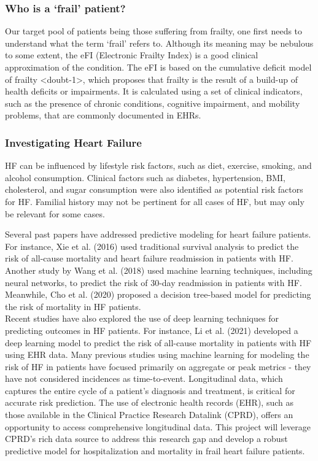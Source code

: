 \documentclass[%
 reprint,
 amsmath,amssymb,
 aps,
 nofootinbib
]{revtex4-2}
\theoremstyle{definition}
\begin{document}
\subsubsection{\label{frail}Who is a `frail' patient?}
Our target pool of patients being those suffering from frailty, one first needs to understand what the term `frail' refers to. Although its meaning may be nebulous to some extent, the eFI (Electronic Frailty Index) is a good clinical approximation of the condition. The eFI is based on the cumulative deficit model of frailty <doubt-1>, which proposes that frailty is the result of a build-up of health deficits or impairments. It is calculated using a set of clinical indicators, such as the presence of chronic conditions, cognitive impairment, and mobility problems, that are commonly documented in EHRs.

\subsubsection{\label{hf}Investigating Heart Failure}
HF can be influenced by lifestyle risk factors, such as diet, exercise, smoking, and alcohol consumption. Clinical factors such as diabetes, hypertension, BMI, cholesterol, and sugar consumption were also identified as potential risk factors for HF. Familial history may not be pertinent for all cases of HF, but may only be relevant for some cases.

Several past papers have addressed predictive modeling for heart failure patients. For instance, Xie et al. (2016) used traditional survival analysis to predict the risk of all-cause mortality and heart failure readmission in patients with HF. Another study by Wang et al. (2018) used machine learning techniques, including neural networks, to predict the risk of 30-day readmission in patients with HF. Meanwhile, Cho et al. (2020) proposed a decision tree-based model for predicting the risk of mortality in HF patients.\\

Recent studies have also explored the use of deep learning techniques for predicting outcomes in HF patients. For instance, Li et al. (2021) developed a deep learning model to predict the risk of all-cause mortality in patients with HF using EHR data. Many previous studies using machine learning for modeling the risk of HF in patients have focused primarily on aggregate or peak metrics - they have not considered incidences as time-to-event. Longitudinal data, which captures the entire cycle of a patient's diagnosis and treatment, is critical for accurate risk prediction. The use of electronic health records (EHR), such as those available in the Clinical Practice Research Datalink (CPRD), offers an opportunity to access comprehensive longitudinal data. This project will leverage CPRD's rich data source to address this research gap and develop a robust predictive model for hospitalization and mortality in frail heart failure patients.\\
\end{document}
